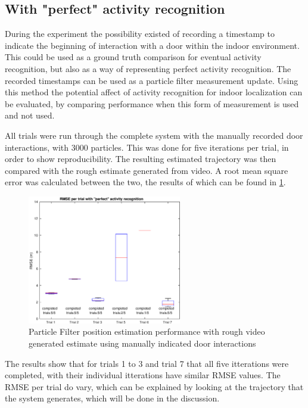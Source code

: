 \subsection{With "perfect" activity recognition}
During the experiment the possibility existed of recording a timestamp to indicate the beginning of interaction with a door within the indoor environment. This could be used as a ground truth comparison for eventual activity recognition, but also as a way of representing perfect activity recognition. The recorded timestamps can be used as a particle filter measurement update. Using this method the potential affect of activity recognition for indoor localization can be evaluated, by comparing performance when this form of measurement is used and not used. \par 

All trials were run through the complete system with the manually recorded door interactions, with 3000 particles. This was done for five iterations per trial, in order to show reproducibility.  The resulting estimated trajectory was then compared with the rough estimate generated from video.  A root mean square error was calculated between the two, the results of which can be found in \cref{fig:pf_boxplot}.

\begin{figure}[H]
	\centering
	\includegraphics[width=0.6\textwidth]{images/20201116_1332_RMSE_per_trial_with_perfect_activity_recognition}
	\caption[Particle Filter position estimation performance with door interaction]{Particle Filter position estimation performance with rough video generated estimate using manually indicated door interactions}	
	\label{fig:pf_boxplot}
\end{figure}

The results show that for trials 1 to 3 and trial 7 that all five itterations were completed, with their individual itterations have similar RMSE values. The RMSE per trial do vary, which can be explained by looking at the trajectory that the system generates, which will be done in the discussion.\par 


